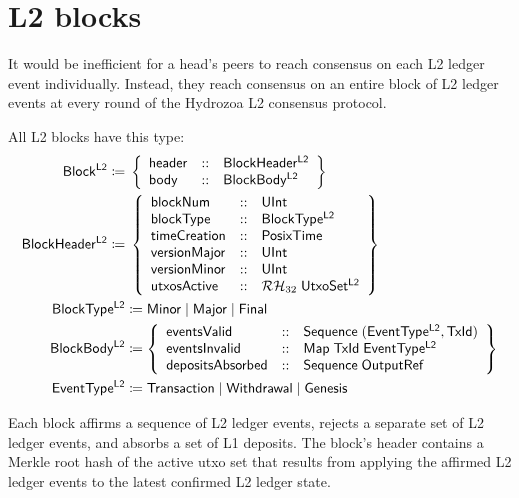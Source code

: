 \documentclass[../hydrozoa.tex]{subfiles}
\begin{document}
\chapter{L2 blocks}%
\label{h:l2-blocks}%

It would be inefficient for a head's peers to reach consensus on each L2 ledger event individually.
Instead, they reach consensus on an entire block of L2 ledger events at every round of the Hydrozoa L2 consensus protocol.

All L2 blocks have this type:
\begin{equation*}
\begin{split}
  \mathsf{Block^{L2}} \coloneq&\; \left\{
    \begin{array}{lll}
      \mathsf{header} &::& \mathsf{BlockHeader^{L2}} \\
      \mathsf{body} &::& \mathsf{BlockBody^{L2}}
    \end{array}\right\} \\
  \mathsf{BlockHeader^{L2}} \coloneq&\; \left\{
    \begin{array}{lll}
      \mathsf{blockNum} &::& \mathsf{UInt} \\
      \mathsf{blockType} &::& \mathsf{BlockType^{L2}} \\
      \mathsf{timeCreation} &::& \mathsf{PosixTime} \\
      \mathsf{versionMajor} &::& \mathsf{UInt} \\
      \mathsf{versionMinor} &::& \mathsf{UInt} \\
      \mathsf{utxosActive} &::& \mathcal{RH}_{32} \; \mathsf{UtxoSet^{L2}}
    \end{array}\right\} \\
  \mathsf{BlockType^{L2}} &\coloneq
    \mathsf{Minor} \mid
    \mathsf{Major} \mid
    \mathsf{Final} \\
  \mathsf{BlockBody^{L2}} &\coloneq \left\{
  \begin{array}{lll}
    \mathsf{eventsValid} &::&
      \mathsf{Sequence} \; (\mathsf{EventType^{L2}}, \mathsf{TxId}) \\
    \mathsf{eventsInvalid} &::&
      \mathsf{Map} \; \mathsf{TxId} \; \mathsf{EventType^{L2}} \\
    \mathsf{depositsAbsorbed} &::& \mathsf{Sequence} \; \mathsf{OutputRef}
  \end{array}\right\} \\
  \mathsf{EventType^{L2}} &\coloneq \mathsf{Transaction} \mid \mathsf{Withdrawal} \mid \mathsf{Genesis}
\end{split}
\end{equation*}

Each block affirms a sequence of L2 ledger events, rejects a separate set of L2 ledger events, and absorbs a set of L1 deposits.
The block's header contains a Merkle root hash of the active utxo set that results from applying the affirmed L2 ledger events to the latest confirmed L2 ledger state.
\end{document}
